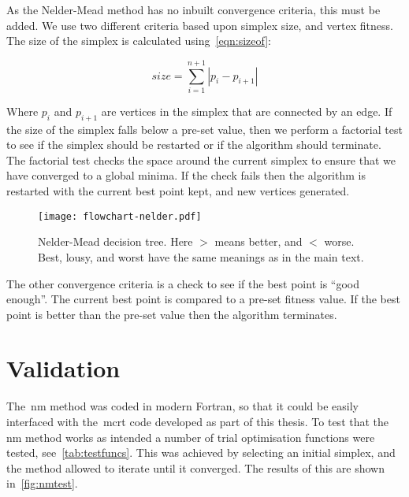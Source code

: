 As the Nelder-Mead method has no inbuilt convergence criteria, this must be added.
We use two different criteria based upon simplex size, and vertex fitness.
The size of the simplex is calculated using~\cref{eqn:sizeof}:

\begin{equation}
size=\sum\limits_{i=1}^{n+1}|p_{i}-p_{i+1}|
\label{eqn:sizeof}
\end{equation}

Where $p_i$ and $p_{i+1}$ are vertices in the simplex that are connected by an edge. 
If the size of the simplex falls below a pre-set value, then we perform a factorial test to see if the simplex should be restarted or if the algorithm should terminate.
The factorial test checks the space around the current simplex to ensure that we have converged to a global minima.
If the check fails then the algorithm is restarted with the current best point kept, and new vertices generated.

\begin{figure}[!htbp]
    \centering
    \texttt{[image: flowchart-nelder.pdf]}
    \caption{Nelder-Mead decision tree. Here $>$ means better, and $<$ worse. Best, lousy, and worst have the same meanings as in the main text.}
    \label{fig:NM-algo}
\end{figure}

The other convergence criteria is a check to see if the best point is ``good enough''.
The current best point is compared to a pre-set fitness value.
If the best point is better than the pre-set value then the algorithm terminates.

\FloatBarrier
\section{Validation}
The~\gls*{nm} method was coded in modern Fortran, so that it could be easily interfaced with the~\gls*{mcrt} code developed as part of this thesis.
To test that the \gls*{nm} method works as intended a number of trial optimisation functions were tested, see~\cref{tab:testfuncs}.
This was achieved by selecting an initial simplex, and the method allowed to iterate until it converged.
The results of this are shown in~\cref{fig:nmtest}.


